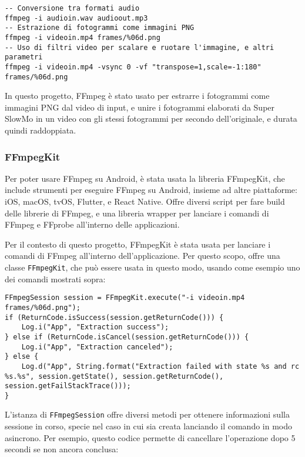 \begin{verbatim}
-- Conversione tra formati audio
ffmpeg -i audioin.wav audioout.mp3
-- Estrazione di fotogrammi come immagini PNG
ffmpeg -i videoin.mp4 frames/%06d.png
-- Uso di filtri video per scalare e ruotare l'immagine, e altri parametri
ffmpeg -i videoin.mp4 -vsync 0 -vf "transpose=1,scale=-1:180" frames/%06d.png
\end{verbatim}

In questo progetto, FFmpeg è stato usato per estrarre i fotogrammi come immagini PNG dal video
di input, e unire i fotogrammi elaborati da Super SlowMo in un video con gli stessi fotogrammi
per secondo dell'originale, e durata quindi raddoppiata.

\subsubsection*{FFmpegKit}

Per poter usare FFmpeg su Android, è stata usata la libreria FFmpegKit, che include strumenti
per eseguire FFmpeg su Android, insieme ad altre piattaforme: iOS, macOS, tvOS, Flutter, e 
React Native. Offre diversi script per fare build delle librerie di FFmpeg, e una libreria 
wrapper per lanciare i comandi di FFmpeg e FFprobe all'interno delle applicazioni. 

Per il contesto di questo progetto, FFmpegKit è stata usata per lanciare i comandi di FFmpeg
all'interno dell'applicazione. Per questo scopo, offre una classe \texttt{FFmpegKit}, che può
essere usata in questo modo, usando come esempio uno dei comandi mostrati sopra:

\begin{lstlisting}
FFmpegSession session = FFmpegKit.execute("-i videoin.mp4 frames/%06d.png");
if (ReturnCode.isSuccess(session.getReturnCode())) {
    Log.i("App", "Extraction success");
} else if (ReturnCode.isCancel(session.getReturnCode())) {
    Log.i("App", "Extraction canceled");
} else {
    Log.d("App", String.format("Extraction failed with state %s and rc %s.%s", session.getState(), session.getReturnCode(), session.getFailStackTrace()));
}
\end{lstlisting}

L'istanza di \texttt{FFmpegSession} offre diversi metodi per ottenere informazioni sulla sessione
in corso, specie nel caso in cui sia creata lanciando il comando in modo asincrono. Per esempio,
questo codice permette di cancellare l'operazione dopo 5 secondi se non ancora conclusa:

